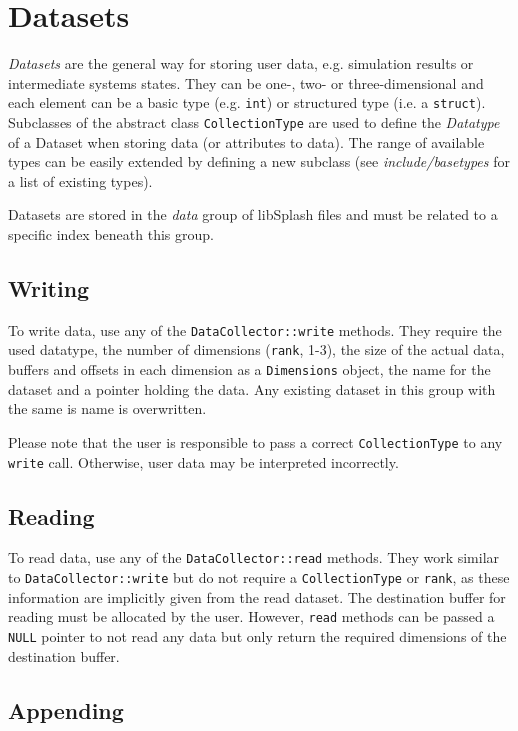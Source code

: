 \documentclass[a4paper,10pt,BCOR12mm]{report}
\begin{document}
\section{Datasets}

\emph{Datasets} are the general way for storing user data, e.g. simulation results or intermediate
systems states. They can be one-, two- or three-dimensional and each element can be
a basic type (e.g. \texttt{int}) or structured type (i.e. a \texttt{struct}).
Subclasses of the abstract class \texttt{CollectionType} are used to define the
\emph{Datatype} of a Dataset when storing data (or attributes to data).
The range of available types can be easily extended by defining a new subclass
(see \emph{include/basetypes} for a list of existing types).

Datasets are stored in the \emph{data} group of libSplash files and must be
related to a specific index beneath this group.

\subsection{Writing}
\label{lab:sdc:write}

To write data, use any of the \texttt{DataCollector::write} methods.
They require the used datatype, the number
of dimensions (\texttt{rank}, 1-3), the size of the actual data, buffers and offsets in
each dimension as a \texttt{Dimensions} object, the name for the dataset and a pointer
holding the data.
Any existing dataset in this group with the same is name is overwritten.

Please note that the user is responsible to pass a correct \texttt{CollectionType} to
any \texttt{write} call. Otherwise, user data may be interpreted incorrectly.

\subsection{Reading}

To read data, use any of the \texttt{DataCollector::read} methods.
They work similar to \texttt{DataCollector::write} but do not require
a \texttt{CollectionType} or \texttt{rank}, as these information are implicitly given from
the read dataset.
The destination buffer for reading must be allocated by the user. However, \texttt{read} methods
can be passed a \texttt{NULL} pointer to not read any data but only return the required dimensions of the
destination buffer.

\subsection{Appending}
\end{document}

